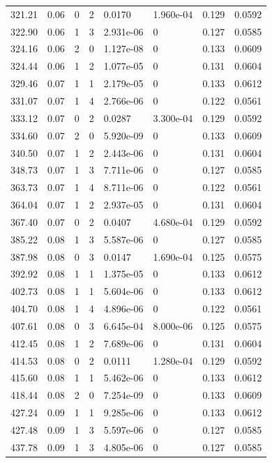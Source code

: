 \documentclass[preview]{standalone}
\begin{document}
{{{\begin{tabular}{L{1.2cm}C{1.2cm} C{0.3cm}C{0.5cm} C{1.4cm}C{1.4cm} C{1.4cm}C{1.4cm}}
  321.21  &  0.06  & 0     &  2 &  0.0170  & 1.960e-04  & 0.129 &  0.0592   \\ 
  322.90  &  0.06  & 1     &  3 &  2.931e-06  & 0  & 0.127 &  0.0585   \\ 
  324.16  &  0.06  & 2     &  0 &  1.127e-08  & 0  & 0.133 &  0.0609   \\ 
  324.44  &  0.06  & 1     &  2 &  1.077e-05  & 0  & 0.131 &  0.0604   \\ 
  329.46  &  0.07  & 1     &  1 &  2.179e-05  & 0  & 0.133 &  0.0612   \\ 
  331.07  &  0.07  & 1     &  4 &  2.766e-06  & 0  & 0.122 &  0.0561   \\ 
  333.12  &  0.07  & 0     &  2 &  0.0287  & 3.300e-04  & 0.129 &  0.0592   \\ 
  334.60  &  0.07  & 2     &  0 &  5.920e-09  & 0  & 0.133 &  0.0609   \\ 
  340.50  &  0.07  & 1     &  2 &  2.443e-06  & 0  & 0.131 &  0.0604   \\ 
  348.73  &  0.07  & 1     &  3 &  7.711e-06  & 0  & 0.127 &  0.0585   \\ 
  363.73  &  0.07  & 1     &  4 &  8.711e-06  & 0  & 0.122 &  0.0561   \\ 
  364.04  &  0.07  & 1     &  2 &  2.937e-05  & 0  & 0.131 &  0.0604   \\ 
  367.40  &  0.07  & 0     &  2 &  0.0407  & 4.680e-04  & 0.129 &  0.0592   \\ 
  385.22  &  0.08  & 1     &  3 &  5.587e-06  & 0  & 0.127 &  0.0585   \\ 
  387.98  &  0.08  & 0     &  3 &  0.0147  & 1.690e-04  & 0.125 &  0.0575   \\ 
  392.92  &  0.08  & 1     &  1 &  1.375e-05  & 0  & 0.133 &  0.0612   \\ 
  402.73  &  0.08  & 1     &  1 &  5.604e-06  & 0  & 0.133 &  0.0612   \\ 
  404.70  &  0.08  & 1     &  4 &  4.896e-06  & 0  & 0.122 &  0.0561   \\ 
  407.61  &  0.08  & 0     &  3 &  6.645e-04  & 8.000e-06  & 0.125 &  0.0575   \\ 
  412.45  &  0.08  & 1     &  2 &  7.689e-06  & 0  & 0.131 &  0.0604   \\ 
  414.53  &  0.08  & 0     &  2 &  0.0111  & 1.280e-04  & 0.129 &  0.0592   \\ 
  415.60  &  0.08  & 1     &  1 &  5.462e-06  & 0  & 0.133 &  0.0612   \\ 
  418.44  &  0.08  & 2     &  0 &  7.254e-09  & 0  & 0.133 &  0.0609   \\ 
  427.24  &  0.09  & 1     &  1 &  9.285e-06  & 0  & 0.133 &  0.0612   \\ 
  427.48  &  0.09  & 1     &  3 &  5.597e-06  & 0  & 0.127 &  0.0585   \\ 
  437.78  &  0.09  & 1     &  3 &  4.805e-06  & 0  & 0.127 &  0.0585   \\ 
\hline 
\end{tabular} 

}}}
\end{document}
